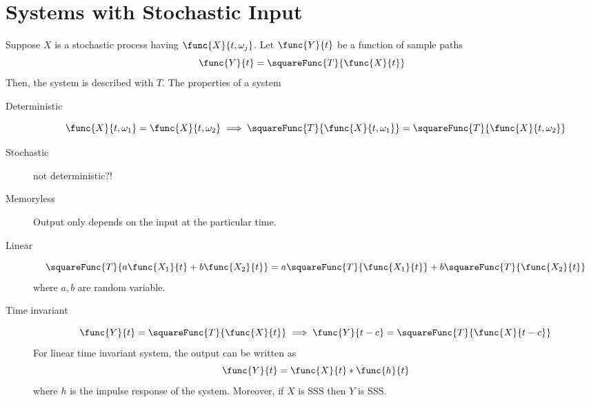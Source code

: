 \section{Systems with Stochastic Input}
Suppose \(X\) is a stochastic process having \(\func{X}{t,\omega_j}\). Let \(\func{Y}{t}\) be a function of sample paths
\begin{equation*}
    \func{Y}{t} = \squareFunc{T}{\func{X}{t}}
\end{equation*}
Then, the system is described with \(T\). The properties of a system 
\begin{description}
    \item[Deterministic]
    \begin{equation*}
        \func{X}{t,\omega_1} = \func{X}{t, \omega_2} \implies \squareFunc{T}{\func{X}{t,\omega_1}} = \squareFunc{T}{\func{X}{t,\omega_2}}
    \end{equation*} 
    \item[Stochastic] not deterministic?!
    \item[Memoryless] Output only depends on the input at the particular time.
    \item[Linear]
    \begin{equation*}
        \squareFunc{T}{a\func{X_1}{t} + b \func{X_2}{t}} = a\squareFunc{T}{\func{X_1}{t}} + b \squareFunc{T}{\func{X_2}{t}}
    \end{equation*}  
    where \(a,b\) are random variable.
    \item[Time invariant]
    \begin{equation*}
        \func{Y}{t}  = \squareFunc{T}{\func{X}{t}} \implies  \func{Y}{t-c}  = \squareFunc{T}{\func{X}{t-c}} 
    \end{equation*} 
    For linear time invariant system, the output can be written as 
    \begin{equation*}
        \func{Y}{t} = \func{X}{t} \ast \func{h}{t}
    \end{equation*}
    where \(h\) is the impulse response of the system. Moreover, if \(X\) is SSS then \(Y\) is SSS.
\end{description}